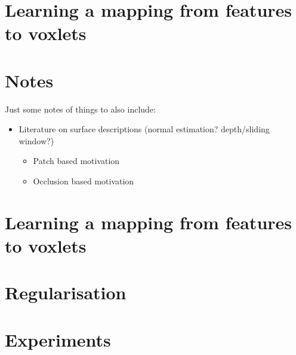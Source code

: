 \documentclass[10pt,twocolumn,letterpaper]{article}
\begin{document}
\section{Learning a mapping from features to voxlets}



\section{Notes}
Just some notes of things to also include:

\begin{itemize}
\item Literature on surface descriptions (normal estimation? depth/sliding window?)
\begin{itemize}
\item Patch based motivation
\item Occlusion based motivation
\end{itemize}
\end{itemize}


\section{Learning a mapping from features to voxlets}


\section{Regularisation}



\section{Experiments}
\end{document}
